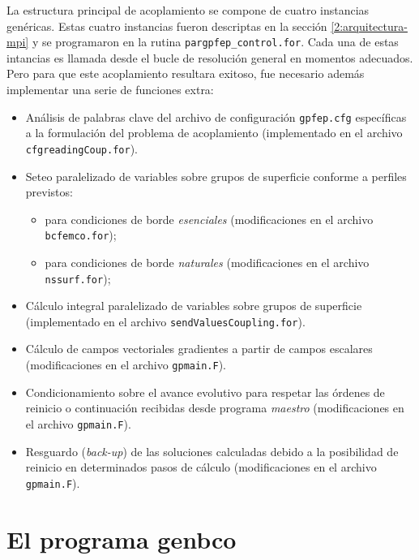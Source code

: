 La estructura principal de acoplamiento se compone de cuatro instancias genéricas.
Estas cuatro instancias fueron descriptas en la sección \ref{2:arquitectura-mpi} y se programaron en la rutina \texttt{pargpfep\_control.for}.
Cada una de estas intancias es llamada desde el bucle de resolución general en momentos adecuados.
Pero para que este acoplamiento resultara exitoso, fue necesario además implementar una serie de funciones extra:
\begin{itemize}
\item Análisis de palabras clave del archivo de configuración \texttt{gpfep.cfg} específicas a la formulación del problema de acoplamiento (implementado en el archivo \texttt{cfgreadingCoup.for}).
\item Seteo paralelizado de variables sobre grupos de superficie conforme a perfiles previstos:
  \begin{itemize} 
  \item para condiciones de borde \textit{esenciales} (modificaciones en el archivo \texttt{bcfemco.for});
  \item para condiciones de borde \textit{naturales} (modificaciones en el archivo \texttt{nssurf.for});
  \end{itemize}
\item Cálculo integral paralelizado de variables sobre grupos de superficie (implementado en el archivo \texttt{sendValuesCoupling.for}).
\item Cálculo de campos vectoriales gradientes a partir de campos escalares (modificaciones en el archivo \texttt{gpmain.F}).
\item Condicionamiento sobre el avance evolutivo para respetar las órdenes de reinicio o continuación recibidas desde programa \textit{maestro} (modificaciones en el archivo \texttt{gpmain.F}).
\item Resguardo (\textit{back-up}) de las soluciones calculadas debido a la posibilidad de reinicio en determinados pasos de cálculo (modificaciones en el archivo \texttt{gpmain.F}).
\end{itemize}

\section{El programa \textbf{genbco}}
\label{genbco}

